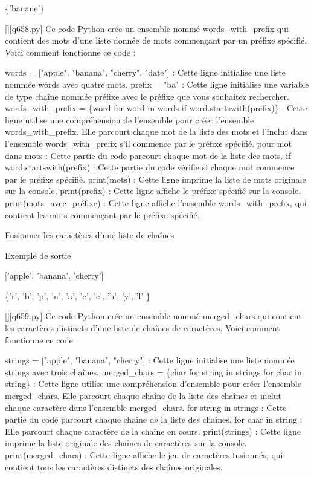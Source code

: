 \{'banane'\}
        \par
        \begin{solution}
            \renewcommand{\nomfichier}{q658.py}
            \pythonfile{\chemincode \nomfichier}[][\nomfichier]
            Ce code Python crée un ensemble nommé words\_with\_prefix qui contient des mots d'une liste donnée de mots commençant par un préfixe spécifié. Voici comment fonctionne ce code :

    words = ["apple", "banana", "cherry", "date"] : Cette ligne initialise une liste nommée words avec quatre mots.
    prefix = "ba" : Cette ligne initialise une variable de type chaîne nommée préfixe avec le préfixe que vous souhaitez rechercher.
    words\_with\_prefix = \{word for word in words if word.startswith(prefix)\} : Cette ligne utilise une compréhension de l'ensemble pour créer l'ensemble words\_with\_prefix. Elle parcourt chaque mot de la liste des mots et l'inclut dans l'ensemble words\_with\_prefix s'il commence par le préfixe spécifié.
        pour mot dans mots : Cette partie du code parcourt chaque mot de la liste des mots.
        if word.startswith(prefix) : Cette partie du code vérifie si chaque mot commence par le préfixe spécifié.
    print(mots) : Cette ligne imprime la liste de mots originale sur la console.
    print(prefix) : Cette ligne affiche le préfixe spécifié sur la console.
    print(mots\_avec\_préfixe) : Cette ligne affiche l'ensemble words\_with\_prefix, qui contient les mots commençant par le préfixe spécifié.
        \end{solution}
        

        \question
        Fusionner les caractères d'une liste de chaînes

Exemple de sortie

['apple', 'banana', 'cherry']

\{'r', 'b', 'p', 'n', 'a', 'e', 'c', 'h', 'y', 'l' \}
        \par
        \begin{solution}
            \renewcommand{\nomfichier}{q659.py}
            \pythonfile{\chemincode \nomfichier}[][\nomfichier]
            Ce code Python crée un ensemble nommé merged\_chars qui contient les caractères distincts d'une liste de chaînes de caractères. Voici comment fonctionne ce code :

    strings = ["apple", "banana", "cherry"] : Cette ligne initialise une liste nommée strings avec trois chaînes.
    merged\_chars = \{char for string in strings for char in string\} : Cette ligne utilise une compréhension d'ensemble pour créer l'ensemble merged\_chars. Elle parcourt chaque chaîne de la liste des chaînes et inclut chaque caractère dans l'ensemble merged\_chars.
        for string in strings : Cette partie du code parcourt chaque chaîne de la liste des chaînes.
        for char in string : Elle parcourt chaque caractère de la chaîne en cours.
    print(strings) : Cette ligne imprime la liste originale des chaînes de caractères sur la console.
    print(merged\_chars) : Cette ligne affiche le jeu de caractères fusionnés, qui contient tous les caractères distincts des chaînes originales.
        \end{solution}
        
